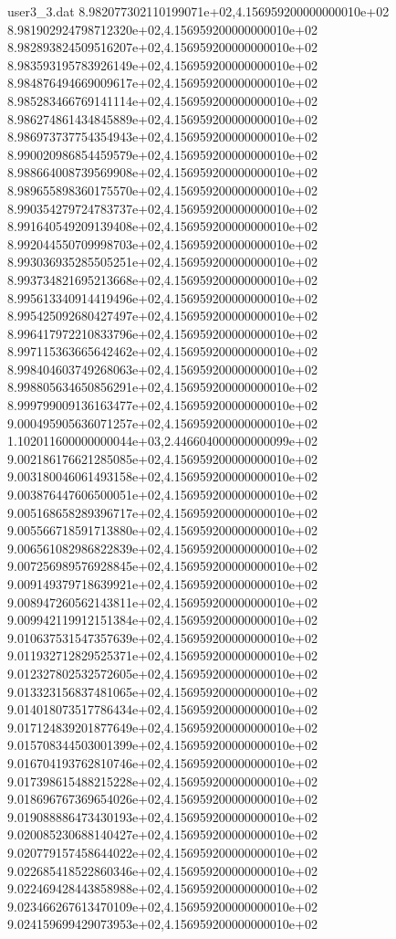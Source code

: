 \begin{filecontents}{user3_3.dat}
8.982077302110199071e+02,4.156959200000000010e+02
8.981902924798712320e+02,4.156959200000000010e+02
8.982893824509516207e+02,4.156959200000000010e+02
8.983593195783926149e+02,4.156959200000000010e+02
8.984876494669009617e+02,4.156959200000000010e+02
8.985283466769141114e+02,4.156959200000000010e+02
8.986274861434845889e+02,4.156959200000000010e+02
8.986973737754354943e+02,4.156959200000000010e+02
8.990020986854459579e+02,4.156959200000000010e+02
8.988664008739569908e+02,4.156959200000000010e+02
8.989655898360175570e+02,4.156959200000000010e+02
8.990354279724783737e+02,4.156959200000000010e+02
8.991640549209139408e+02,4.156959200000000010e+02
8.992044550709998703e+02,4.156959200000000010e+02
8.993036935285505251e+02,4.156959200000000010e+02
8.993734821695213668e+02,4.156959200000000010e+02
8.995613340914419496e+02,4.156959200000000010e+02
8.995425092680427497e+02,4.156959200000000010e+02
8.996417972210833796e+02,4.156959200000000010e+02
8.997115363665642462e+02,4.156959200000000010e+02
8.998404603749268063e+02,4.156959200000000010e+02
8.998805634650856291e+02,4.156959200000000010e+02
8.999799009136163477e+02,4.156959200000000010e+02
9.000495905636071257e+02,4.156959200000000010e+02
1.102011600000000044e+03,2.446604000000000099e+02
9.002186176621285085e+02,4.156959200000000010e+02
9.003180046061493158e+02,4.156959200000000010e+02
9.003876447606500051e+02,4.156959200000000010e+02
9.005168658289396717e+02,4.156959200000000010e+02
9.005566718591713880e+02,4.156959200000000010e+02
9.006561082986822839e+02,4.156959200000000010e+02
9.007256989576928845e+02,4.156959200000000010e+02
9.009149379718639921e+02,4.156959200000000010e+02
9.008947260562143811e+02,4.156959200000000010e+02
9.009942119912151384e+02,4.156959200000000010e+02
9.010637531547357639e+02,4.156959200000000010e+02
9.011932712829525371e+02,4.156959200000000010e+02
9.012327802532572605e+02,4.156959200000000010e+02
9.013323156837481065e+02,4.156959200000000010e+02
9.014018073517786434e+02,4.156959200000000010e+02
9.017124839201877649e+02,4.156959200000000010e+02
9.015708344503001399e+02,4.156959200000000010e+02
9.016704193762810746e+02,4.156959200000000010e+02
9.017398615488215228e+02,4.156959200000000010e+02
9.018696767369654026e+02,4.156959200000000010e+02
9.019088886473430193e+02,4.156959200000000010e+02
9.020085230688140427e+02,4.156959200000000010e+02
9.020779157458644022e+02,4.156959200000000010e+02
9.022685418522860346e+02,4.156959200000000010e+02
9.022469428443858988e+02,4.156959200000000010e+02
9.023466267613470109e+02,4.156959200000000010e+02
9.024159699429073953e+02,4.156959200000000010e+02

\end{filecontents}
